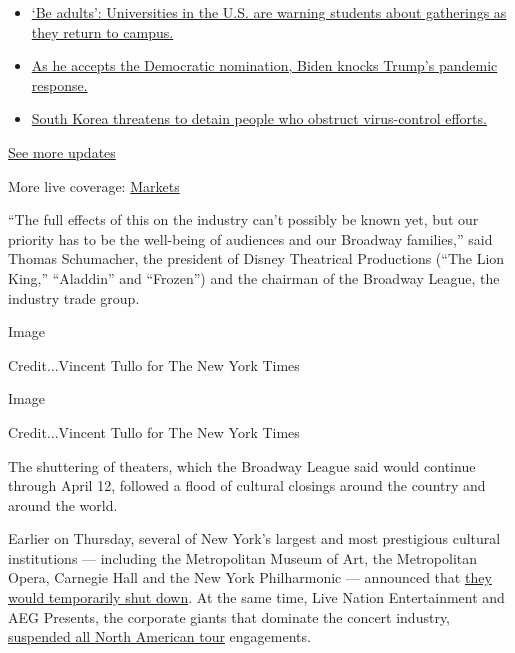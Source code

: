 \begin{itemize}
\tightlist
\item
  \href{https://www.nytimes3xbfgragh.onion/2020/08/21/world/covid-19-coronavirus.html?action=click\&pgtype=Article\&state=default\&region=MAIN_CONTENT_1\&context=storylines_live_updates\#link-6a60a19d}{`Be
  adults': Universities in the U.S. are warning students about
  gatherings as they return to campus.}
\item
  \href{https://www.nytimes3xbfgragh.onion/2020/08/21/world/covid-19-coronavirus.html?action=click\&pgtype=Article\&state=default\&region=MAIN_CONTENT_1\&context=storylines_live_updates\#link-324af071}{As
  he accepts the Democratic nomination, Biden knocks Trump's pandemic
  response.}
\item
  \href{https://www.nytimes3xbfgragh.onion/2020/08/21/world/covid-19-coronavirus.html?action=click\&pgtype=Article\&state=default\&region=MAIN_CONTENT_1\&context=storylines_live_updates\#link-191d44be}{South
  Korea threatens to detain people who obstruct virus-control efforts.}
\end{itemize}

\href{https://www.nytimes3xbfgragh.onion/2020/08/21/world/covid-19-coronavirus.html?action=click\&pgtype=Article\&state=default\&region=MAIN_CONTENT_1\&context=storylines_live_updates}{See
more updates}

More live coverage:
\href{https://www.nytimes3xbfgragh.onion/live/2020/08/21/business/stock-market-today-coronavirus?action=click\&pgtype=Article\&state=default\&region=MAIN_CONTENT_1\&context=storylines_live_updates}{Markets}

``The full effects of this on the industry can't possibly be known yet,
but our priority has to be the well-being of audiences and our Broadway
families,'' said Thomas Schumacher, the president of Disney Theatrical
Productions (``The Lion King,'' ``Aladdin'' and ``Frozen'') and the
chairman of the Broadway League, the industry trade group.

Image

Credit...Vincent Tullo for The New York Times

Image

Credit...Vincent Tullo for The New York Times

The shuttering of theaters, which the Broadway League said would
continue through April 12, followed a flood of cultural closings around
the country and around the world.

Earlier on Thursday, several of New York's largest and most prestigious
cultural institutions --- including the Metropolitan Museum of Art, the
Metropolitan Opera, Carnegie Hall and the New York Philharmonic ---
announced that
\href{https://www.nytimes3xbfgragh.onion/2020/03/12/arts/design/met-museum-opera-carnegie-hall-close-coronavirus.html}{they
would temporarily shut down}. At the same time, Live Nation
Entertainment and AEG Presents, the corporate giants that dominate the
concert industry,
\href{https://www.nytimes3xbfgragh.onion/2020/03/10/arts/music/coronavirus-coachella-postponed.html}{suspended
all North American tour} engagements.

